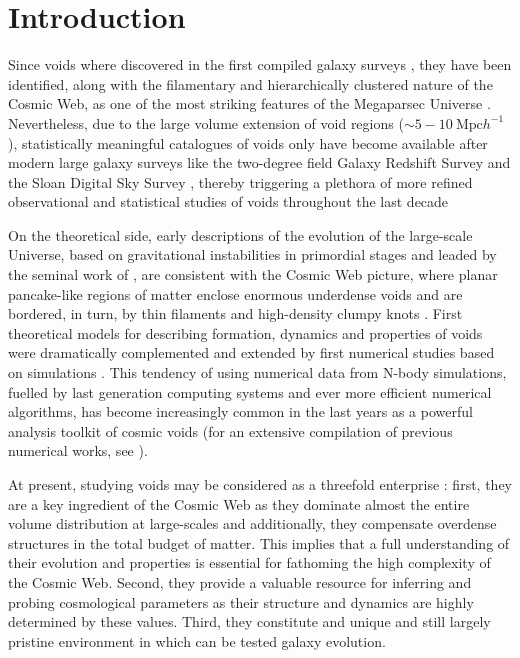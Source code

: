 \documentclass[a4,useAMS,usenatbib,usegraphicx]{latex/mn2e}
\begin{document}
\section{Introduction}
\label{sec:introduction}


Since voids where discovered in the first compiled galaxy surveys 
\citep{Chincarini75, Gregory78, Einasto80M, Einasto80N, Kirshner81, 
Kirshner87}, they have been identified, along with the filamentary and 
hierarchically clustered nature of the Cosmic Web, as one of the most 
striking features of the Megaparsec Universe \citep{Bond96}. Nevertheless,
due to the large volume extension of void regions ($\sim 5-10\ \mbox{Mpc} 
h^{-1}$), statistically meaningful catalogues of voids \citep{Pan10, 
Sutter12b, Nadathur14} only have become available after modern large 
galaxy surveys like the two-degree field Galaxy Redshift Survey \citep{
Colless01, Colless03} and the Sloan Digital Sky Survey \citep{York00,
Abazajian03}, thereby triggering a plethora of more refined observational 
and statistical studies of voids throughout the last decade \citep{Hoyle04,
Croton04, Rojas05, Ceccarelli06, Patiri06a, Tikhonov06, Patiri06b, 
Tikhonov07, BendaBeckmann08, Foster09, Ceccarelli13, Sutter14a}


On the theoretical side, early descriptions of the evolution of the 
large-scale Universe, based on gravitational instabilities in primordial 
stages and leaded by the seminal work of \citet{Zeldovich70}, are 
consistent with the Cosmic Web picture, where planar pancake-like regions 
of matter enclose enormous underdense voids and are bordered, in turn, by 
thin filaments and high-density clumpy knots \citep{Bond96}. First 
theoretical models for describing formation, dynamics and properties of 
voids \citep{Hoffman82, Icke84, Bertschinger85, Blumenthal92} were 
dramatically complemented and extended by first numerical studies based 
on simulations \citep{Martel90, Regos91, Weygaert93, Dubinski93}. This 
tendency of using numerical data from N-body simulations, fuelled by last 
generation computing systems and ever more efficient numerical algorithms, 
has become increasingly common in the last years as a powerful analysis 
toolkit of cosmic voids (for an extensive compilation of previous 
numerical works, see \citet{Colberg08}).


At present, studying voids may be considered as a threefold enterprise
\citep{Platen07}: first, they are a key ingredient of the Cosmic Web as 
they dominate almost the entire volume distribution at large-scales and 
additionally, they compensate overdense structures in the total budget of 
matter. This implies that a full understanding of their evolution and 
properties is essential for fathoming the high complexity of the Cosmic 
Web. Second, they provide a valuable resource for inferring and probing 
cosmological parameters as their structure and dynamics are highly 
determined by these values. Third, they constitute and unique and still 
largely pristine environment in which can be tested galaxy evolution.
\end{document}
